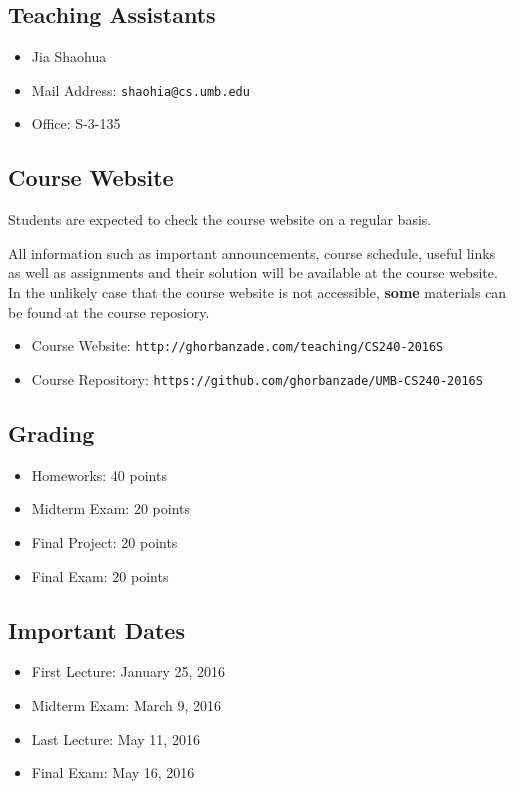 \documentclass[12pt,letterpaper,twoside]{article}
\begin{document}
\subsection*{Teaching Assistants}
\begin{itemize}
\item[] Jia Shaohua
\item[] Mail Address: \texttt{shaohia@cs.umb.edu}
\item[] Office: S-3-135
\end{itemize}

\subsection*{Course Website}
Students are expected to check the course website on a regular basis.

All information such as important announcements, course schedule, useful links as well as assignments and their solution will be available at the course website.
In the unlikely case that the course website is not accessible, \textbf{some} materials can be found at the course reposiory.

\begin{itemize}
\item[] Course Website: \texttt{\footnotesize http://ghorbanzade.com/teaching/CS240-2016S}
\item[] Course Repository: \texttt{\footnotesize https://github.com/ghorbanzade/UMB-CS240-2016S}
\end{itemize}

\subsection*{Grading}
\begin{itemize}
\item[] Homeworks: 40 points
\item[] Midterm Exam: 20 points
\item[] Final Project: 20 points
\item[] Final Exam: 20 points
\end{itemize}

\subsection*{Important Dates}
\begin{itemize}
\item[] First Lecture: January 25, 2016
\item[] Midterm Exam: March 9, 2016
\item[] Last Lecture: May 11, 2016
\item[] Final Exam: May 16, 2016
\end{itemize}
\end{document}
